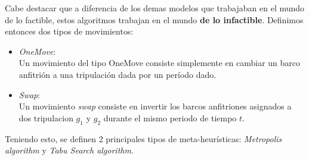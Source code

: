 \documentclass[letter, 10pt]{article}
\begin{document}
Cabe destacar que a diferencia de los demas modelos que trabajaban en el mundo de lo factible, estos algoritmos trabajan en el mundo \textbf{de lo infactible}.
Definimos entonces dos tipos de movimientos:
\begin{itemize}
    \item \textit{OneMove}: \\
    Un movimiento del tipo OneMove consiste simplemente en cambiar un barco anfitrión a una tripulación dada por un período dado.
    
    \item \textit{Swap}: \\
    Un movimiento \textit{swap} consiste en invertir los barcos anfitriones asignados a dos tripulacion $g_1$ y $g_2$ durante el mismo periodo de tiempo $t$. 
\end{itemize}

Teniendo esto, se definen 2 principales tipos de meta-heurísticas: \textit{Metropolis algorithm} y \textit{Tabu Search algorithm}. 
\end{document}
